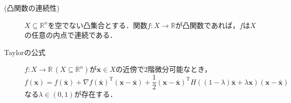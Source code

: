 \documentclass{jsreport}
\begin{document}
\begin{description}
  \item[(凸関数の連続性)] $X \subseteq \mathbb{R}^n$を空でない凸集合とする．関数$f: X \rightarrow \mathbb{R}$が凸関数であれば，$f$は$X$の任意の内点で連続である．
  \item[Taylorの公式] $f: X \rightarrow \mathbb{R} \, (X \subseteq \mathbb{R}^n)$が$\bar{\bm{x}} \in X$の近傍で2階微分可能なとき，
  \begin{equation}
    f(\bm{x}) = f(\bar{\bm{x}}) + \nabla f(\bar{\bm{x}})^{\mathrm{T}} (\bm{x} - \bar{\bm{x}}) + \frac{1}{2} (\bm{x} - \bar{\bm{x}})^{\mathrm{T}} H((1 - \lambda)\bar{\bm{x}} + \lambda \bm{x})(\bm{x} - \bar{\bm{x}}) \nonumber
  \end{equation}
  なる$\lambda \in (0, 1)$が存在する．
\end{description}
\end{document}
